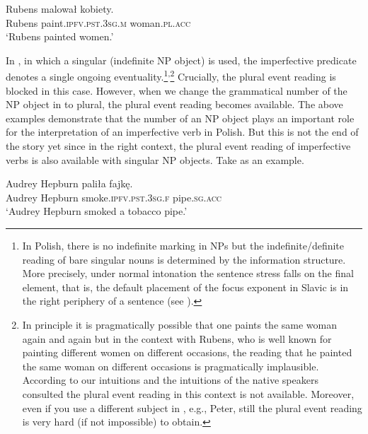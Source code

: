 \documentclass[output=paper]{langscibook}
\begin{document}
\ea
\gll Rubens malował kobiety.\label{jan-bla:fansb:kb:ex5}\\  
     Rubens paint.\textsc{ipfv}.\textsc{pst}.\textsc{3sg}.\textsc{m} woman.\textsc{pl}.\textsc{acc}\\
\glt ‘Rubens painted women.’
\z

\noindent In , in which a singular (indefinite NP object) is used, the imperfective predicate denotes a single ongoing eventuality.\footnote{In Polish, there is no indefinite marking in NPs but the indefinite/definite reading of bare singular nouns is determined by the information structure. More precisely, under normal intonation the sentence stress falls on the final element, that is, the default placement of the focus exponent in Slavic is in the right periphery of a sentence (see \citealt{Junghanns2002Prinzipien}).}\textsuperscript{,}\footnote{In principle it is pragmatically possible that one paints the same woman again and again but in the context with Rubens, who is well known for painting different women on different occasions, the reading that he painted the same woman on different occasions is pragmatically implausible. According to our intuitions and the intuitions of the native speakers consulted the plural event reading in this context is not available. Moreover, even if you use a different subject in , e.g., Peter, still the plural event reading is very hard (if not impossible) to obtain.} Crucially, the plural event reading is blocked in this case. However, when we change the grammatical number of the NP object in  to plural, the plural event reading becomes available. The above examples demonstrate that the number of an NP object plays an important role for the interpretation of an imperfective verb in Polish. But this is not the end of the story yet since in the right context, the plural event reading of imperfective verbs is also available with singular NP objects. Take  as an example.

\ea
\gll Audrey Hepburn paliła fajkę.\label{jan-bla:fansb:kb:ex6}\\  
     Audrey Hepburn smoke.\textsc{ipfv}.\textsc{pst}.\textsc{3sg}.\textsc{f} pipe.\textsc{sg}.\textsc{acc}\\
\glt ‘Audrey Hepburn smoked a tobacco pipe.’
\z
\end{document}
